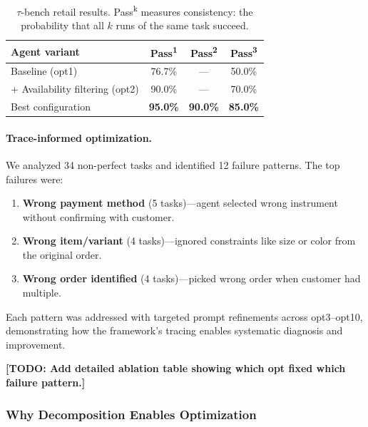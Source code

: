 \documentclass[11pt, logo, onecolumn, copyright, colorlinks=true, allcolors=blue]{nvidiatechreport}
\newcommand{\placeholder}[1]{\textcolor{red!60!black}{\textbf{[TODO: #1]}}}
\begin{document}
\begin{table}[h]
\centering
\caption{$\tau$-bench retail results. Pass\textsuperscript{k} measures
consistency: the probability that all $k$ runs of the same task succeed.}
\label{tab:taubench}
\begin{tabular}{lccc}
\toprule
\textbf{Agent variant} & \textbf{Pass\textsuperscript{1}} & \textbf{Pass\textsuperscript{2}} & \textbf{Pass\textsuperscript{3}} \\
\midrule
Baseline (opt1) & 76.7\% & --- & 50.0\% \\
+ Availability filtering (opt2) & 90.0\% & --- & 70.0\% \\
Best configuration & \textbf{95.0\%} & \textbf{90.0\%} & \textbf{85.0\%} \\
\bottomrule
\end{tabular}
\end{table}

\paragraph{Trace-informed optimization.} We analyzed 34 non-perfect tasks and
identified 12 failure patterns. The top failures were:

\begin{enumerate}
  \item \textbf{Wrong payment method} (5 tasks)---agent selected wrong
        instrument without confirming with customer.
  \item \textbf{Wrong item/variant} (4 tasks)---ignored constraints like size
        or color from the original order.
  \item \textbf{Wrong order identified} (4 tasks)---picked wrong order when
        customer had multiple.
\end{enumerate}

Each pattern was addressed with targeted prompt refinements across opt3--opt10,
demonstrating how the framework's tracing enables systematic diagnosis and
improvement.

\placeholder{Add detailed ablation table showing which opt fixed which failure pattern.}

\subsubsection{Why Decomposition Enables Optimization}
\label{sec:optimization:why}
\end{document}
